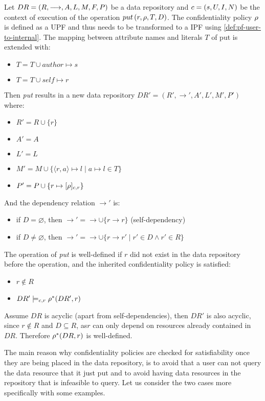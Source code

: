 \begin{definition}
Let $DR= \left( R, \longrightarrow, A, L, M, F, P \right)$ be a data repository and $c = \left( s, U, I, N \right)$ be the context of execution of the operation $put \left( r, \rho, T, D \right)$. The confidentiality policy $\rho$ is defined as a UPF and thus needs to be transformed to a IPF using \autoref{def:pf-user-to-internal}. The mapping between attribute names and literals $T$ of put is extended with: 
\begin{itemize}
    \item $T = T \cup author \mapsto s$
    \item $T = T \cup self \mapsto r$
\end{itemize}
Then \emph{put} results in a new data repository $DR'=\left(R', \longrightarrow', A', L', M', P' \right)$ where:
\begin{itemize}
    \item $R' = R \cup \{r\}$
    \item $A' = A$
    \item $L' = L$
    \item $M' = M \cup \{ \langle r,a \rangle \mapsto l \mid a \mapsto l \in T \}$
    \item $P' = P \cup \{ r \mapsto [\rho]_{c,r} \}$
\end{itemize}
And the dependency relation $\longrightarrow'$ is:
\begin{itemize}
    \item if $D = \varnothing$, then $\longrightarrow' = \longrightarrow \cup \{r \longrightarrow r\}$ (self-dependency)
    \item if $D \neq \varnothing$, then $\longrightarrow' = \longrightarrow \cup \{r \longrightarrow r' \mid r' \in D \land r' \in R \}$
\end{itemize}
The operation of \emph{put} is well-defined if $r$ did not exist in the data repository before the operation, and the inherited confidentiality policy is satisfied:
\begin{itemize}
    \item $r \not\in R$
    \item $DR' \models_{c,r} \rho^{\ast}(DR',r)$
\end{itemize}
Assume $DR$ is acyclic (apart from self-dependencies), then $DR'$ is also acyclic, since $r \notin R$ and $D \subseteq R$, as$r$ can only depend on resources already contained in $DR$. Therefore $\rho^{\ast}(DR,r)$ is well-defined.
\end{definition}

The main reason why confidentiality policies are checked for satisfiability once they are being placed in the data repository, is to avoid that a user can not query the data resource that it just put and to avoid having data resources in the repository that is infeasible to query. Let us consider the two cases more specifically with some examples.


